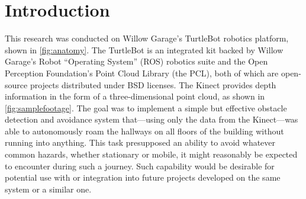 \documentclass[12pt]{report}
\begin{document}
\setcounter{page}{3}
\tableofcontents
\clearpage
{}
{}
\listoffigures
\clearpage
{}
{}
\listoftables
\newpage

\section{Introduction}
This research was conducted on Willow Garage's TurtleBot robotics platform, shown in \autoref{fig:anatomy}.  The TurtleBot is an integrated kit backed by Willow Garage's Robot ``Operating System'' (ROS) robotics suite and the Open Perception Foundation's Point Cloud Library (the PCL), both of which are open-source projects distributed under BSD licenses.  The Kinect provides depth information in the form of a three-dimensional point cloud, as shown in \autoref{fig:samplefootage}.
The goal was to implement a simple but effective obstacle detection and avoidance system that---using only the data from the Kinect---was able to autonomously roam the hallways on all floors of the building without running into anything.  This task presupposed an ability to avoid whatever common hazards, whether stationary or mobile, it might reasonably be expected to encounter during such a journey.  Such capability would be desirable for potential use with or integration into future projects developed on the same system or a similar one.
\end{document}
